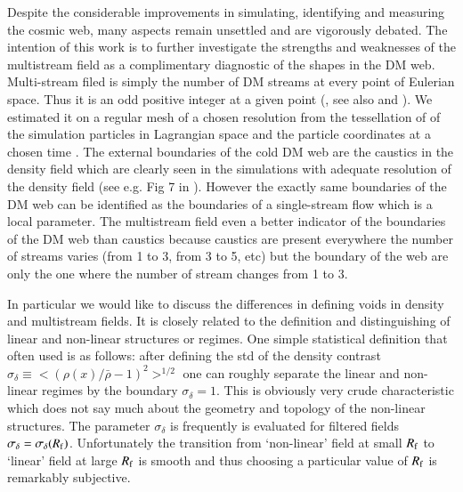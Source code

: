 
Despite the considerable improvements  in simulating, identifying and measuring the cosmic web, many aspects remain unsettled and are vigorously debated. 
The intention of this work is to further investigate the strengths and weaknesses of the multistream field as a complimentary diagnostic of the shapes in the DM web. 
Multi-stream filed is simply the number of DM streams at every point of Eulerian space.  Thus it is an odd positive integer at a given point (\citealt{Arnold1982}, see also \citealt{Shandarin1989} and \citealt{Hidding2014}). We estimated it  on a regular mesh of a chosen resolution from the tessellation of of the simulation particles in Lagrangian space and the particle coordinates at a chosen time \cite{Shandarin2012}.
The external boundaries of the cold DM web are the caustics in the density field which are clearly seen in
the simulations with adequate resolution of the density field (see e.g. Fig 7 in \citet{Hahn2015a}). However the exactly same boundaries of the DM web can be identified as the boundaries of a single-stream flow which is a local parameter. The multistream field even a better indicator of the boundaries of the DM web than caustics because caustics are present everywhere  the number of streams varies (from 1 to 3, from 3 to 5, etc) but the boundary of the web are only the one where the number of stream changes from 1 to 3.

In particular we would like to discuss the differences in defining voids in density and multistream fields. It is closely related to the definition and distinguishing of linear and non-linear structures or regimes. One simple statistical definition that often used  is as follows:  after defining the std of the density contrast $\sigma_{\delta} \equiv <(\rho(x)/ \bar{\rho} - 1)^2>^{1/2}$ one can roughly separate the linear and non-linear regimes by the boundary $\sigma_{\delta}=1$. This is obviously very crude characteristic which does not say much about the geometry and topology of the non-linear structures. The parameter $\sigma_{\delta}$ is frequently is evaluated for filtered fields $\sigma_{\delta} = \sigma_{\delta}(R_{\rm f})$. Unfortunately the transition from `non-linear'  field at small $R_{\rm f}$ to `linear' field at large  $R_{\rm f}$ is smooth and thus choosing a particular value of  $R_{\rm f}$ is remarkably subjective. 

